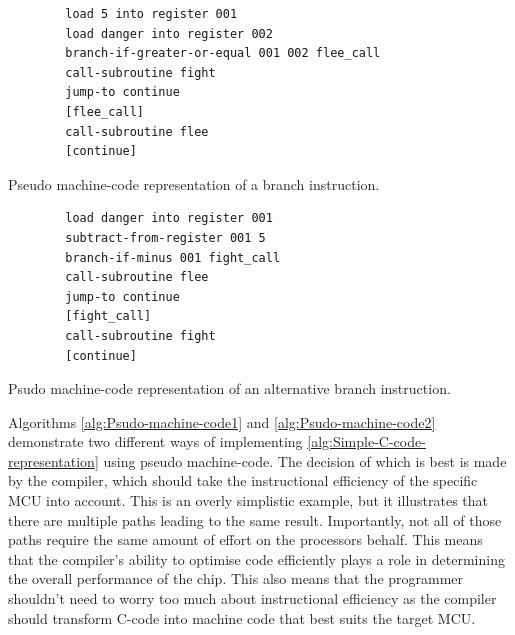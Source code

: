       \begin{algorithm}
        \begin{lstlisting}
        load 5 into register 001
        load danger into register 002
        branch-if-greater-or-equal 001 002 flee_call
        call-subroutine fight
        jump-to continue
        [flee_call]
        call-subroutine flee
        [continue]
        \end{lstlisting}
        \caption{\label{alg:Psudo-machine-code1}Pseudo machine-code representation
        of a branch instruction.}
      \end{algorithm}

      \begin{algorithm}
        \begin{lstlisting}
        load danger into register 001
        subtract-from-register 001 5
        branch-if-minus 001 fight_call
        call-subroutine flee
        jump-to continue
        [fight_call]
        call-subroutine fight
        [continue]
        \end{lstlisting}
        \caption{\label{alg:Psudo-machine-code2}Psudo machine-code representation of an alternative branch instruction.}
      \end{algorithm}


      Algorithms \ref{alg:Psudo-machine-code1} and \ref{alg:Psudo-machine-code2} demonstrate two different ways of implementing \ref{alg:Simple-C-code-representation} using pseudo machine-code.
      The decision of which is best is made by the compiler, which should take the instructional efficiency of the specific MCU into account.
      This is an overly simplistic example, but it illustrates that there are multiple paths leading to the same result.
      Importantly, not all of those paths require the same amount of effort on the processors behalf.
      This means that the compiler's ability to optimise code efficiently plays a role in determining the overall performance of the chip.
      This also means that the programmer shouldn't need to worry too much about instructional efficiency as the compiler should transform C-code into machine code that best suits the target MCU.

